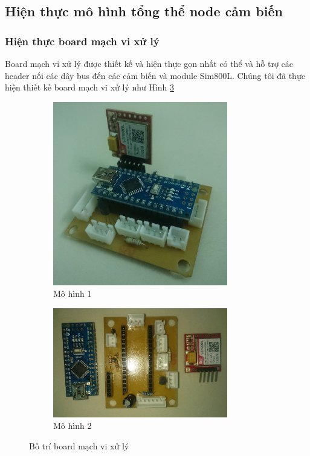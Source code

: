 \newpage
\subsection{Hiện thực mô hình tổng thể node cảm biến}
\subsubsection*{Hiện thực board mạch vi xử lý}
Board mạch vi xử lý được thiết kế và hiện thực gọn nhất có thể và hỗ trợ các header nối các dây bus đến các cảm biến và module Sim800L. Chúng tôi đã thực hiện thiết kế board mạch vi xử lý như Hình \ref{fig:botrimcu}

\begin{figure}[H]
\centering  
  \begin{subfigure}[b]{0.5\textwidth}
    \includegraphics[width=3in]{mcu}
    \caption[Mô hình 1]{Mô hình 1}
    \label{fig:mcu}
  \end{subfigure}\hfill
  \begin{subfigure}[b]{0.5\textwidth}
    \includegraphics[width=3in]{mcu_2}
  	 \caption[Mô hình 2]{Mô hình 2}
    \label{fig:mcu_2}
  \end{subfigure}
  \caption{Bố trí board mạch vi xử lý}\label{fig:botrimcu}
\end{figure}


